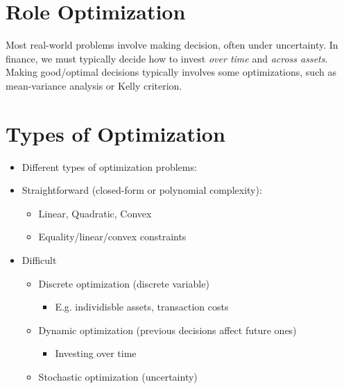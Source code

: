 \documentclass[
  oneside]{book}
\providecommand{\tightlist}{%
  \setlength{\itemsep}{0pt}\setlength{\parskip}{0pt}}
\begin{document}
\hypertarget{role-optimization}{%
\section{Role Optimization}\label{role-optimization}}

Most real-world problems involve making decision, often under uncertainty. In finance, we must typically decide how to invest \emph{over time} and \emph{across assets}. Making good/optimal decisions typically involves some optimizations, such as mean-variance analysis or Kelly criterion.

\hypertarget{types-of-optimization}{%
\section{Types of Optimization}\label{types-of-optimization}}

\begin{itemize}
\tightlist
\item
  Different types of optimization problems:
\item
  Straightforward (closed-form or polynomial complexity):

  \begin{itemize}
  \tightlist
  \item
    Linear, Quadratic, Convex
  \item
    Equality/linear/convex constraints
  \end{itemize}
\item
  Difficult

  \begin{itemize}
  \tightlist
  \item
    Discrete optimization (discrete variable)

    \begin{itemize}
    \tightlist
    \item
      E.g. individisble assets, transaction costs
    \end{itemize}
  \item
    Dynamic optimization (previous decisions affect future ones)

    \begin{itemize}
    \tightlist
    \item
      Investing over time
    \end{itemize}
  \item
    Stochastic optimization (uncertainty)
  \end{itemize}
\end{itemize}
\end{document}
